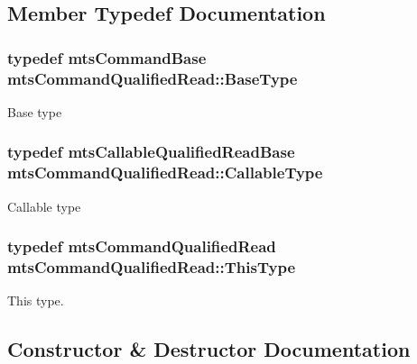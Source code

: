 \subsection{Member Typedef Documentation}
\hypertarget{classmts_command_qualified_read_a594530e3533708ab5f6535c5ccf6addd}{}
\subsubsection[{Base\+Type}]{\setlength{\rightskip}{0pt plus 5cm}typedef {\bf mts\+Command\+Base} {\bf mts\+Command\+Qualified\+Read\+::\+Base\+Type}}\label{classmts_command_qualified_read_a594530e3533708ab5f6535c5ccf6addd}
Base type \hypertarget{classmts_command_qualified_read_a95ca582ba302ac597fb9106a8270cce5}{}
\subsubsection[{Callable\+Type}]{\setlength{\rightskip}{0pt plus 5cm}typedef {\bf mts\+Callable\+Qualified\+Read\+Base} {\bf mts\+Command\+Qualified\+Read\+::\+Callable\+Type}}\label{classmts_command_qualified_read_a95ca582ba302ac597fb9106a8270cce5}
Callable type \hypertarget{classmts_command_qualified_read_a360793a513215088a297832b6066f368}{}
\subsubsection[{This\+Type}]{\setlength{\rightskip}{0pt plus 5cm}typedef {\bf mts\+Command\+Qualified\+Read} {\bf mts\+Command\+Qualified\+Read\+::\+This\+Type}}\label{classmts_command_qualified_read_a360793a513215088a297832b6066f368}
This type. 

\subsection{Constructor \& Destructor Documentation}
\hypertarget{classmts_command_qualified_read_a8e6ae9f298cbc23e90768ace8842035d}{}
